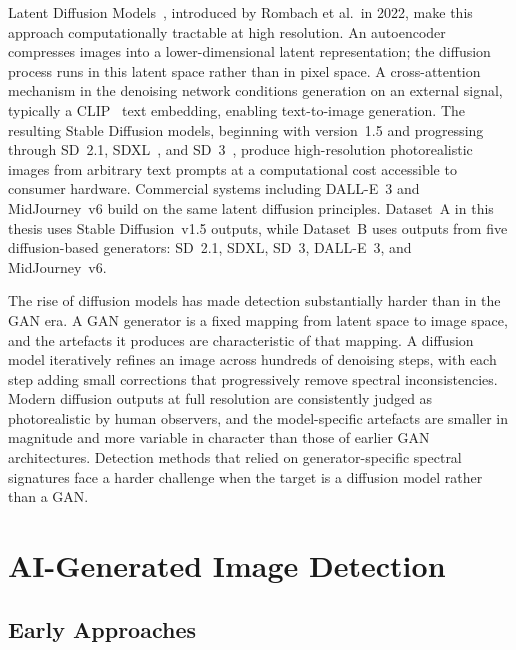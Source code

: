 Latent Diffusion Models~\cite{rombach2022}, introduced by Rombach et al.\ in 2022, make
this approach computationally tractable at high resolution. An autoencoder compresses
images into a lower-dimensional latent representation; the diffusion process runs in this
latent space rather than in pixel space. A cross-attention mechanism in the denoising
network conditions generation on an external signal, typically a CLIP~\cite{radford2021clip} text embedding,
enabling text-to-image generation. The resulting Stable Diffusion models, beginning with
version~1.5 and progressing through SD~2.1, SDXL~\cite{podell2023sdxl}, and SD~3~\cite{esser2024sd3}, produce high-resolution
photorealistic images from arbitrary text prompts at a computational cost accessible to
consumer hardware. Commercial systems including DALL-E~3 and MidJourney~v6 build on the
same latent diffusion principles. Dataset~A in this thesis uses Stable Diffusion~v1.5
outputs, while Dataset~B uses outputs from five diffusion-based generators: SD~2.1,
SDXL, SD~3, DALL-E~3, and MidJourney~v6.

The rise of diffusion models has made detection substantially harder than in the GAN era.
A GAN generator is a fixed mapping from latent space to image space, and the artefacts it
produces are characteristic of that mapping. A diffusion model iteratively refines an
image across hundreds of denoising steps, with each step adding small corrections
that progressively remove spectral inconsistencies. Modern diffusion outputs at full
resolution are consistently judged as photorealistic by human observers, and the
model-specific artefacts are smaller in magnitude and more variable in character than
those of earlier GAN architectures. Detection methods that relied on generator-specific
spectral signatures face a harder challenge when the target is a diffusion model rather than
a GAN.


\section{AI-Generated Image Detection}
\label{sec:detection_methods}

\subsection{Early Approaches}
\label{subsec:early_detection}

